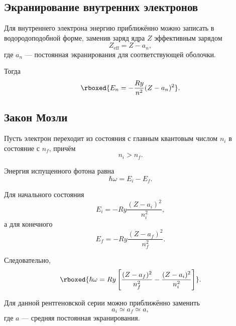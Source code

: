 \documentclass[../final.tex]{subfiles}
\begin{document}
\subsection{Экранирование внутренних электронов}

Для внутреннего электрона энергию приближённо можно записать
в водородоподобной форме, заменив заряд ядра \(Z\) эффективным зарядом
\begin{equation*}
    Z_{\mathrm{eff}}
    =
    Z-a_n,
\end{equation*}
где \(a_n\) --- постоянная экранирования для соответствующей оболочки.

Тогда
\begin{equation*}
    \rboxed{
        E_n
        =
        -\frac{Ry}{n^2}
        (Z-a_n)^2
    }.
\end{equation*}

\subsection{Закон Мозли}

Пусть электрон переходит из состояния с главным квантовым числом
\(n_i\) в состояние с \(n_f\), причём
\begin{equation*}
    n_i>n_f.
\end{equation*}

Энергия испущенного фотона равна
\begin{equation*}
    \hbar\omega
    =
    E_i-E_f.
\end{equation*}

Для начального состояния
\begin{equation*}
    E_i
    =
    -Ry
    \frac{(Z-a_i)^2}{n_i^2},
\end{equation*}
а для конечного
\begin{equation*}
    E_f
    =
    -Ry
    \frac{(Z-a_f)^2}{n_f^2}.
\end{equation*}

Следовательно,
\begin{equation*}
    \rboxed{
        \hbar\omega
        =
        Ry
        \left[
            \frac{(Z-a_f)^2}{n_f^2}
            -
            \frac{(Z-a_i)^2}{n_i^2}
        \right]
    }.
\end{equation*}

Для данной рентгеновской серии можно приближённо заменить
\begin{equation*}
    a_i\simeq a_f\simeq a,
\end{equation*}
где \(a\) --- средняя постоянная экранирования.
\end{document}
